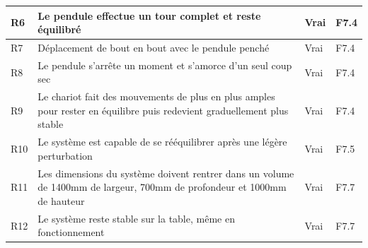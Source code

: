 \begin{table}[H]
{\begin{tabular}{|l|l|l|l|}
            R6                                                                                                                      & Le pendule effectue un tour complet et reste équilibré                  & Vrai             & F7.4     \\ \hline
            R7                                                                                                                      & Déplacement de bout en bout avec le pendule penché                      & Vrai             & F7.4     \\ \hline
            R8                                                                                                                      & Le pendule s'arrête un moment et s'amorce d'un seul coup sec            & Vrai             & F7.4     \\ \hline
            R9                                                                                                                      &
            Le chariot fait des mouvements de plus en plus amples pour rester en équilibre puis redevient graduellement plus stable &
            Vrai                                                                                                                    &
            F7.4                                                                                                                                                                                                                            \\ \hline
            R10                                                                                                                     & Le système est capable de se rééquilibrer après une légère perturbation & Vrai             & F7.5     \\ \hline
            R11                                                                                                                     &
            Les dimensions du système doivent rentrer dans un volume de 1400mm de largeur, 700mm de profondeur et 1000mm de hauteur &
            Vrai                                                                                                                    &
            F7.7                                                                                                                                                                                                                            \\ \hline
            R12                                                                                                                     & Le système reste stable sur la table, même en fonctionnement            & Vrai             & F7.7     \\ \hline

\end{tabular}}
\end{table}

